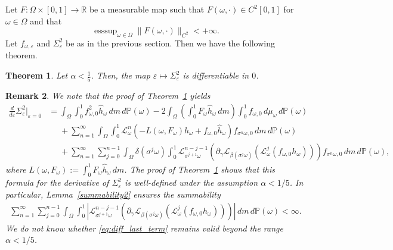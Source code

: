 \documentclass[12pt,reqno,a4paper]{article}
\newcommand{\ve}{\varepsilon}
\newtheorem{theorem}{Theorem}
\newtheorem{remark}[theorem]{Remark}
\DeclareMathOperator{\esssup}{esssup}
\begin{document}
	Let $F\colon \Omega \times [0, 1] \to \mathbb R$ be a measurable map such that $F(\omega, \cdot)\in C^2[0, 1]$ for $\omega \in \Omega$ and that
	\begin{equation}\label{observ2}
		\esssup_{\omega \in \Omega}\|F(\omega, \cdot)\|_{C^2}<+\infty.
	\end{equation}
Let $f_{\omega, \varepsilon}$ and $\Sigma_\varepsilon^2$ be as in the previous section. Then we have the following theorem.
\begin{theorem}\label{diffvar}
	Let $\alpha <\frac 1 5$. Then, 
	the map $\varepsilon \mapsto \Sigma_\varepsilon^2$ is differentiable in $0$.
\end{theorem}

\begin{remark}\label{formula}
	We note that the proof of Theorem~\ref{diffvar} yields  
	\[
	\begin{split}
		\frac{d}{d\ve}\Sigma_\ve^2 \big\rvert_{\ve=0} &=\int_\Omega \int_0^1 f_{\omega, 0}^2 \hat h_\omega \, dm\, d\mathbb P(\omega)-2\int_\Omega \left (\int_0^1 F_\omega \hat h_\omega \, dm\right )\int_0^1 f_{\omega, 0}\, d\mu_\omega \, d\mathbb P(\omega) \\
		&\phantom{=}+\sum_{n=1}^\infty \int_\Omega \int_0^1 \mathcal L_\omega^n (-L(\omega, F_\omega)h_\omega+f_{\omega, 0}\hat h_\omega)f_{\sigma^n \omega, 0}\, dm\, d\mathbb P(\omega) \\
		&\phantom{=}+\sum_{n=1}^\infty \sum_{j=0}^{n-1}\int_\Omega \delta (\sigma^j \omega)\int_0^1\mathcal L_{\sigma^{j+1}\omega}^{n-j-1} \left (\partial_\gamma \mathcal L_{\beta(\sigma^j \omega)}(\mathcal L_\omega^j(f_{\omega, 0}h_\omega))\right )f_{\sigma^n \omega, 0}\, dm\, d\mathbb P(\omega),
	\end{split}
	\]
	where $L(\omega, F_\omega):=\int_0^1 F_\omega \hat h_\omega \, dm$. 
	The proof of Theorem~\ref{diffvar} shows that this formula for 
	the derivative of 
	$\Sigma_\ve^2$ is well-defined 
	under the assumption $\alpha < 1/5$. In particular, Lemma~\ref{summability2} ensures the summability
	\begin{align}\label{eq:diff_last_term}
		\sum_{n=1}^\infty \sum_{j=0}^{n-1}\int_\Omega \int_0^1  |\mathcal L_{\sigma^{j+1}\omega}^{n-j-1} \left (\partial_\gamma \mathcal L_{\beta(\sigma^j \omega)}(\mathcal L_\omega^j(f_{\omega, 0}h_\omega))\right ) | \, dm\, d\mathbb P(\omega) < \infty.
	\end{align}
	We do not know whether \eqref{eq:diff_last_term} remains valid beyond 
	the range $\alpha < 1/5$.
\end{remark}
\end{document}
